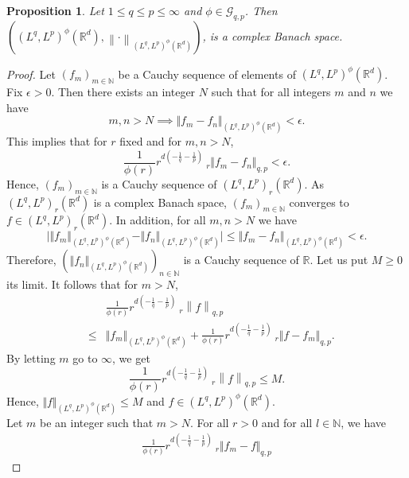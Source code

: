 \documentclass[a4paper,12pt,intlimits,oneside]{amsart}
\numberwithin{equation}{section}
\newtheorem{proposition}[theorem]{Proposition}
\numberwithin{equation}{section}
\theoremstyle{definition}
\begin{document}
\begin{proposition}
 Let $1\leq q \leq p\leq \infty$ and $\phi \in \mathcal{G}_{q,p}$. Then \\ $\left((L^{q},L^{p})^{\phi}(\mathbb{R}^{d}),  \left\|\cdot\right\|_{(L^{q},L^{p})^{\phi}(\mathbb{R}^{d})}\right)$, is a complex Banach space.
 \end{proposition}

\begin{proof}
Let $ (f_{m})_{m \in \mathbb{N}} $ be a Cauchy sequence of elements of $ (L^{q},L^{p})^{\phi}(\mathbb{R}^{d})$. \\ Fix $\epsilon > 0$. Then there exists an integer $ N $ such that for all integers $ m $ and $ n $ we have
 	$$  m,n > N \implies \Vert f_{m} - f_{n} \Vert_{(L^{q},L^{p})^{\phi}(\mathbb{R}^{d})}  < \epsilon. $$
 This implies that for $ r $ fixed and for $  m,n > N $,
 		$$\frac{1}{\phi(r)} r^{d(-\frac{1}{q}-\frac{1}{p})}\: _{r}\Vert f_{m} - f_{n} \Vert_{q,p}  < \epsilon. $$
 Hence, $ (f_{m})_{m \in \mathbb{N}} $ is a Cauchy sequence of $ \left(L^{q},L^{p}\right)_{r}(\mathbb{R}^{d}) $.	As $ \left(L^{q},L^{p}\right)_{r}(\mathbb{R}^{d}) $ is a complex
 Banach space, $ (f_{m})_{m \in \mathbb{N}} $ converges to $f \in (L^{q}, L^{p})_{r} (\mathbb{R}^{d})$.  In addition, for all $ m,n > N $ we
 have
 		$$ \vert \Vert f_{m} \Vert_{(L^{q},L^{p})^{\phi}(\mathbb{R}^{d})} - \Vert f_{n} \Vert_{(L^{q},L^{p})^{\phi}(\mathbb{R}^{d})} \vert \leq \Vert f_{m} - f_{n} \Vert_{(L^{q},L^{p})^{\phi}(\mathbb{R}^{d})} < \epsilon.$$
 Therefore, $(\Vert f_{n} \Vert_{(L^{q},L^{p})^{\phi}(\mathbb{R}^{d})})_{n \in \mathbb{N}}$ is a Cauchy sequence of $ \mathbb{R}$. Let us put $M \ge 0$ its limit. It follows that for $ m > N $,
 	\begin{eqnarray*}
 & &	\frac{1}{\phi(r)} r^{d(-\frac{1}{q}-\frac{1}{p})}\: _{r}\left\|f\right\|_{q,p}\\
 		& \leq & \Vert f_{m} \Vert_{(L^{q},L^{p})^{\phi}(\mathbb{R}^{d})} + \frac{1}{\phi(r)} r^{d(-\frac{1}{q}-\frac{1}{p})} \:_{r}\Vert f - f_{m} \Vert_{q,p}.
 	\end{eqnarray*}
 	By letting $ m $ go to $ \infty $, we get
  $$ \frac{1}{\phi(r)} r^{d(-\frac{1}{q}-\frac{1}{p})}\ _{r}\left\|f\right\|_{q,p} \leq M.$$
  Hence, $\Vert f \Vert_{(L^{q},L^{p})^{\phi}(\mathbb{R}^{d})} \leq M$ and $f \in  (L^{q},L^{p})^{\phi}(\mathbb{R}^{d})$. \\
 Let $ m $ be an integer such that $m>N$. For all $r>0 $ and for all $l \in \mathbb{N}$, we have
 \begin{eqnarray*}
 \frac{1}{\phi(r)} r^{d(-\frac{1}{q}-\frac{1}{p})} \:_{r}\Vert f_{m} -f \Vert_{q,p}

\end{eqnarray*}
\end{proof}
\end{document}
